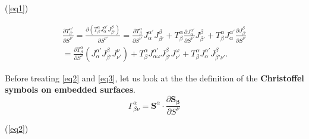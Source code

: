 \documentclass[../main.tex]{subfiles}
\begin{document}
(\ref{eq1})

\begin{multline}
\frac{\partial T^{\alpha'}_{\beta'}}{\partial S^{\nu'}}
    =\frac{\partial \left(T^{\alpha}_{\beta}J^{\alpha'}_{\alpha}J^{\beta}_{\beta'}\right)}{\partial S^{\nu'}}
    =\frac{\partial T^{\alpha}_{\beta}}{\partial S^{\nu'}}
    J^{\alpha'}_{\alpha}J^{\beta}_{\beta'}
    +T^{\alpha}_{\beta}\frac{\partial J^{\alpha'}_{\alpha}}{\partial S^{\nu'}}J^{\beta}_{\beta'}
    +T^{\alpha}_{\beta}J^{\alpha'}_{\alpha}\frac{\partial J^{\beta}_{\beta'}}{\partial S^{\nu'}} \\
    =\frac{\partial T^{\alpha}_{\beta}}{\partial S^{\nu}}
    \left(J^{\alpha'}_{\alpha}J^{\beta}_{\beta'}J^{\nu}_{\nu'}\right)
    +T^{\alpha}_{\beta}J^{\alpha'}_{\alpha \omega}J^{\beta}_{\beta'}J^{\omega}_{\nu'}
    +T^{\alpha}_{\beta}J^{\alpha'}_{\alpha}J^{\beta}_{\beta' \nu'}.
\end{multline}

\newpage

Before treating \ref{eq2} and \ref{eq3}, let us look at the the definition of the \textbf{Christoffel symbols on embedded surfaces}.
\begin{equation}
    \Gamma^{\alpha}_{\beta \nu}=\mathbf{S}^{\alpha}\cdot\frac{\partial \mathbf{S_\beta}}{\partial S^\nu}
    \label{christoffel_symbols_embedded_surface_def}
\end{equation}

(\ref{eq2})
\end{document}
